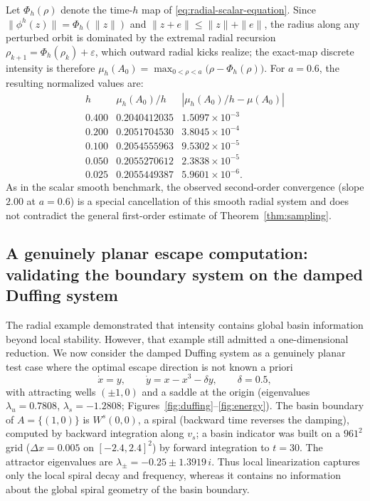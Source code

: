 \documentclass[pdflatex,sn-mathphys-num]{sn-jnl}
\numberwithin{equation}{section}
\theoremstyle{thmstyleone}%
\theoremstyle{definition}
\theoremstyle{remark}
\begin{document}
Let \(\Phi_h(\rho)\) denote the time-\(h\) map of \eqref{eq:radial-scalar-equation}. Since \(\|\phi^h(z)\|=\Phi_h(\|z\|)\) and \(\|z+e\|\leq\|z\|+\|e\|\), the radius along any perturbed orbit is dominated by the extremal radial recursion \(\rho_{k+1}=\Phi_h(\rho_k)+\varepsilon\), which outward radial kicks realize; the exact-map discrete intensity is therefore
    $\mu_h(A_0)
    =
    \max_{0<\rho<a}
    \bigl(\rho-\Phi_h(\rho)\bigr)$.
For \(a=0.6\), the resulting normalized values are:
\[
\begin{array}{c|cc}
    h & \mu_h(A_0)/h
      & |\mu_h(A_0)/h-\mu(A_0)|\\
    \hline
    0.400 &0.2040412035&1.5097\times10^{-3}\\
    0.200 &0.2051704530&3.8045\times10^{-4}\\
    0.100 &0.2054555963&9.5302\times10^{-5}\\
    0.050 &0.2055270612&2.3838\times10^{-5}\\
    0.025 &0.2055449387&5.9601\times10^{-6}.
\end{array}
\]
As in the scalar smooth benchmark, the observed second-order convergence (slope \(2.00\) at \(a=0.6\)) is a special cancellation of this smooth radial system and does not contradict the general first-order estimate of Theorem~\ref{thm:sampling}.

\subsection{A genuinely planar escape computation: validating the boundary system on the damped Duffing system}
\label{subsec:duffing-escape}

The radial example demonstrated that intensity contains global basin information beyond local stability. However, that example still admitted a one-dimensional reduction. We now consider the damped Duffing system as a genuinely planar test case where the optimal escape direction is not known a priori \citep{guckenheimer2013nonlinear,thompson2002nonlinear,kovacic2011duffing}
\begin{equation}
    \dot x=y,\qquad \dot y=x-x^3-\delta y,\qquad \delta=0.5,
    \label{eq:duffing-system}
\end{equation}
with attracting wells $(\pm1,0)$ and a saddle at the origin (eigenvalues $\lambda_u=0.7808$, $\lambda_s=-1.2808$; Figures~\ref{fig:duffing}--\ref{fig:energy}). The basin boundary of $A=\{(1,0)\}$ is $W^s(0,0)$, a spiral (backward time reverses the damping), computed by backward integration along $v_s$; a basin indicator was built on a $961^2$ grid ($\Delta x=0.005$ on $[-2.4,2.4]^2$) by forward integration to $t=30$. The attractor eigenvalues are
$\lambda_\pm=-0.25\pm1.3919\,i$.
Thus local linearization captures only the local spiral decay and frequency, whereas it contains no information about the global spiral geometry of the basin boundary.
\end{document}
